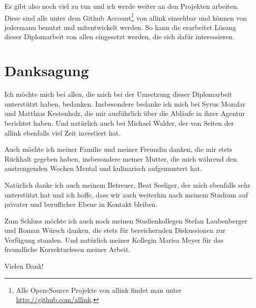 Es gibt also noch viel zu tun und ich werde weiter an den Projekten arbeiten. 
Diese sind alle unter dem Github Account\footnote{Alle Open-Source
Projekte von allink findet man unter \url{http://github.com/allink}.} von allink
einsehbar und können von jedermann benutzt und mitentwickelt werden. So kann
die erarbeitet Lösung dieser Diplomarbeit von allen eingesetzt werden, die
sich dafür interessieren. 

\section{Danksagung}
Ich möchte mich bei allen, die mich bei der Umsetzung dieser Diplomarbeit
unterstützt haben, bedanken. Insbesondere bedanke ich mich bei Syrus Mozafar
und Matthias Kestenholz, die mir ausführlich über die Abläufe in ihrer Agentur
berichtet haben. Und natürlich auch bei Michael Walder, der von Seiten der allink
ebenfalls viel Zeit investiert hat.

Auch möchte ich meiner Familie und meiner Freundin danken, die mir stets Rückhalt 
gegeben haben, insbesondere meiner Mutter, die mich während den anstrengenden Wochen 
Mental und kulinarisch aufgemuntert hat.

Natürlich danke ich auch meinem Betreuer, Beat Seeliger, der mich ebenfalls
sehr unterstützt hat und ich hoffe, dass wir auch weiterhin nach meinem
Studium auf privater und beruflicher Ebene in Kontakt bleiben.

Zum Schluss möchte ich auch noch meinen Studienkollegen Stefan Laubenberger
und Roman Würsch danken, die stets für bereichernden Diskussionen zur 
Verfügung standen. Und natürlich meiner Kollegin Marisa Meyer für das freundliche 
Korrekturlesen meiner Arbeit.

Vielen Dank!

